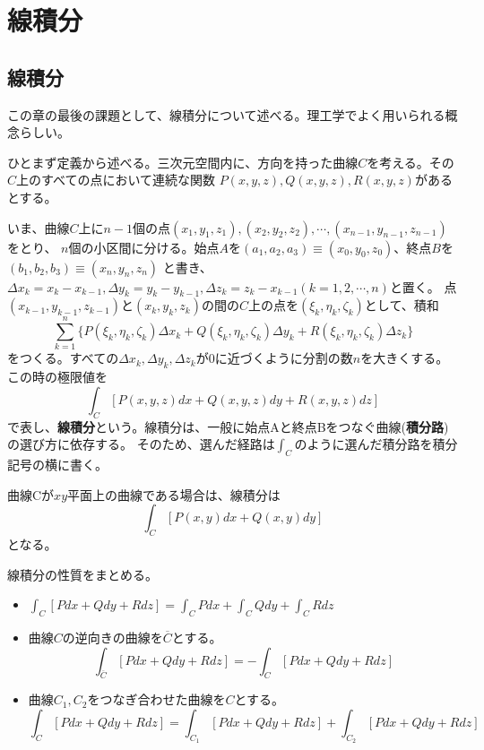 \documentclass[a4j,dvipdfmx]{jsarticle}
\begin{document}
\section{線積分}
\subsection{線積分}
この章の最後の課題として、線積分について述べる。理工学でよく用いられる概念らしい。

ひとまず定義から述べる。三次元空間内に、方向を持った曲線$C$を考える。その$C$上のすべての点において連続な関数
$P(x,y,z),Q(x,y,z),R(x,y,z)$があるとする。

いま、曲線$C$上に$n-1$個の点$(x_1,y_1,z_1),(x_2,y_2,z_2),\cdots,(x_{n-1},y_{n-1},z_{n-1})$をとり、
$n$個の小区間に分ける。始点$A$を$(a_1,a_2,a_3)\equiv(x_0,y_0,z_0)$、終点$B$を$(b_1,b_2,b_3)\equiv(x_n,y_n,z_n)$
と書き、$\Delta x_k=x_k-x_{k-1},\Delta y_k=y_k-y_{k-1},\Delta z_k=z_k-x_{k-1}(k=1,2,\cdots,n)$と置く。
点$(x_{k-1},y_{k-1},z_{k-1})$と$(x_k,y_k,z_k)$の間の$C$上の点を$(\xi_k,\eta_k,\zeta_k)$として、積和
\begin{equation}
    \sum_{k=1}^{n}\{P(\xi_k,\eta_k,\zeta_k)\Delta x_k+Q(\xi_k,\eta_k,\zeta_k)\Delta y_k+R(\xi_k,\eta_k,\zeta_k)\Delta z_k\}\label{6.49}
\end{equation}
をつくる。すべての$\Delta x_k,\Delta y_k,\Delta z_k$が$0$に近づくように分割の数$n$を大きくする。
この時の極限値を
\begin{equation}
    \int_C[P(x,y,z)dx+Q(x,y,z)dy+R(x,y,z)dz]\label{6.50}
\end{equation}
で表し、\textbf{線積分}という。線積分は、一般に始点Aと終点Bをつなぐ曲線(\textbf{積分路})の選び方に依存する。
そのため、選んだ経路は$\int_C$のように選んだ積分路を積分記号の横に書く。

曲線Cが$xy$平面上の曲線である場合は、線積分は
\begin{equation*}
    \int_C[P(x,y)dx+Q(x,y)dy]
\end{equation*}
となる。

線積分の性質をまとめる。
\begin{itemize}
    \item $\displaystyle\int_C[Pdx+Qdy+Rdz]=\int_CPdx+\int_CQdy+\int_CRdz$
    \item 曲線$C$の逆向きの曲線を$\overline{C}$とする。\\
    \begin{equation*}
        \int_{\overline{C}}[Pdx+Qdy+Rdz]=-\int_C[Pdx+Qdy+Rdz]
    \end{equation*}
    \item 曲線$C_1,C_2$をつなぎ合わせた曲線を$C$とする。\\
    \begin{equation*}
        \int_C[Pdx+Qdy+Rdz]=\int_{C_1}[Pdx+Qdy+Rdz]+\int_{C_2}[Pdx+Qdy+Rdz]
    \end{equation*}
\end{itemize}
\end{document}
